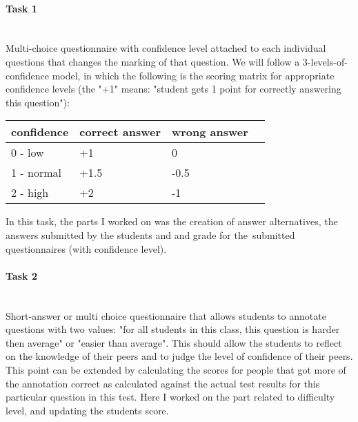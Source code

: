 \paragraph{Task 1} ~\\
Multi-choice questionnaire with confidence level attached to each individual questions that changes the marking of that question. 
We will follow a 3-levels-of-confidence model, in which the following is the scoring matrix for appropriate confidence levels 
(the "+1" means: "student gets 1 point for correctly answering this question"):
\begin{center}
	\begin{tabular}{ | l | l | l | p{5cm} |} \hline 		
		confidence 	& correct answer 	& wrong answer  \\ \hline
		0 - low 	& +1 				& 0  			\\ \hline
		1 - normal 	& +1.5 				& -0.5  		\\ \hline
		2 - high 	& +2 				& -1  			\\ \hline
	\end{tabular}
\end{center}
In this task, the parts I worked on was the creation of answer alternatives, the answers submitted by the students and and grade for the submitted questionnaires (with confidence level).

\paragraph{Task 2} ~\\
Short-answer or multi choice questionnaire that allows students to annotate questions with two values: 
"for all students in this class, this question is harder then average" or "easier than average". 
This should allow the students to reflect on the knowledge of their peers and to judge the level of confidence of their peers. 
This point can be extended by calculating the scores for people that got more of the annotation correct as calculated against the actual test results 
for this particular question in this test.
\vspace{0.5em}\newline
Here I worked on the part related to difficulty level, and updating the students score.

